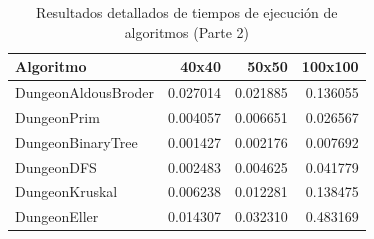 \begin{table}
\centering
\caption{Resultados detallados de tiempos de ejecución de algoritmos (Parte 2)}
\label{tab:resultados_detallados_parte2}
\begin{tabular}{lrrr}
\toprule
          Algoritmo &    40x40 &    50x50 &  100x100 \\
\midrule
DungeonAldousBroder & 0.027014 & 0.021885 & 0.136055 \\
        DungeonPrim & 0.004057 & 0.006651 & 0.026567 \\
  DungeonBinaryTree & 0.001427 & 0.002176 & 0.007692 \\
         DungeonDFS & 0.002483 & 0.004625 & 0.041779 \\
     DungeonKruskal & 0.006238 & 0.012281 & 0.138475 \\
       DungeonEller & 0.014307 & 0.032310 & 0.483169 \\
\bottomrule
\end{tabular}
\end{table}

